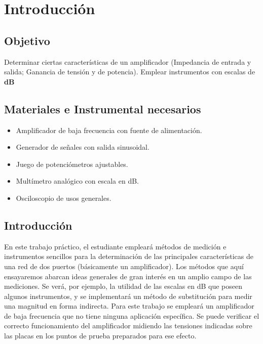 \chapter{Introducción}
\section{Objetivo}
Determinar ciertas características de un amplificador (Impedancia de entrada y salida; Ganancia de tensión y de potencia). Emplear instrumentos con escalas de \textbf{dB}

\section{Materiales e Instrumental necesarios}
\begin{itemize}
	\item Amplificador de baja frecuencia con fuente de alimentación.
	\item Generador de señales con salida sinusoidal.
	\item Juego de potenciómetros ajustables.
	\item Multímetro analógico con escala en dB.
	\item Osciloscopio de usos generales.
\end{itemize}

\section{Introducción}
En este trabajo práctico, el estudiante empleará métodos de medición e instrumentos sencillos para la determinación de las principales características de una red de dos puertos (básicamente un amplificador).  Los métodos  que aquí ensayaremos abarcan ideas generales de gran interés en un amplio campo de las mediciones. Se verá,  por ejemplo, la utilidad de las escalas en dB que poseen algunos instrumentos, y se implementará un método de substitución para medir una
magnitud en forma indirecta.
Para este trabajo se empleará un amplificador de baja frecuencia  que no tiene ninguna aplicación específica.
Se puede verificar el correcto funcionamiento  del amplificador midiendo las tensiones indicadas sobre las placas en los puntos de prueba preparados para ese efecto.




